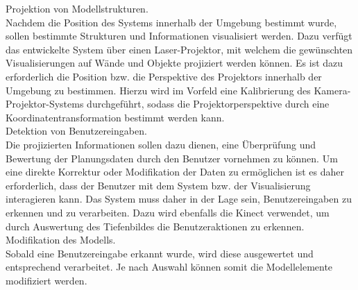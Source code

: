 Projektion von Modellstrukturen.\\
Nachdem die Position des Systems innerhalb der Umgebung bestimmt wurde, sollen bestimmte Strukturen und Informationen visualisiert werden. Dazu verfügt das entwickelte System über einen Laser-Projektor, mit welchem die gewünschten Visualisierungen auf Wände und Objekte projiziert werden können. Es ist dazu erforderlich die Position bzw. die Perspektive des Projektors innerhalb der Umgebung zu bestimmen. Hierzu wird im Vorfeld eine Kalibrierung des Kamera-Projektor-Systems durchgeführt, sodass die Projektorperspektive durch eine Koordinatentransformation bestimmt werden kann.\\

Detektion von Benutzereingaben.\\
Die projizierten Informationen sollen dazu dienen, eine Überprüfung und Bewertung der Planungsdaten durch den Benutzer vornehmen zu können. Um eine direkte Korrektur oder Modifikation der Daten zu ermöglichen ist es daher erforderlich, dass der Benutzer mit dem System bzw. der Visualisierung interagieren kann. Das System muss daher in der Lage sein, Benutzereingaben zu erkennen und zu verarbeiten. Dazu wird ebenfalls die Kinect verwendet, um durch Auswertung des Tiefenbildes die Benutzeraktionen zu erkennen.\\

Modifikation des Modells.\\
Sobald eine Benutzereingabe erkannt wurde, wird diese ausgewertet und entsprechend verarbeitet. Je nach Auswahl können somit die Modellelemente modifiziert werden.\\

